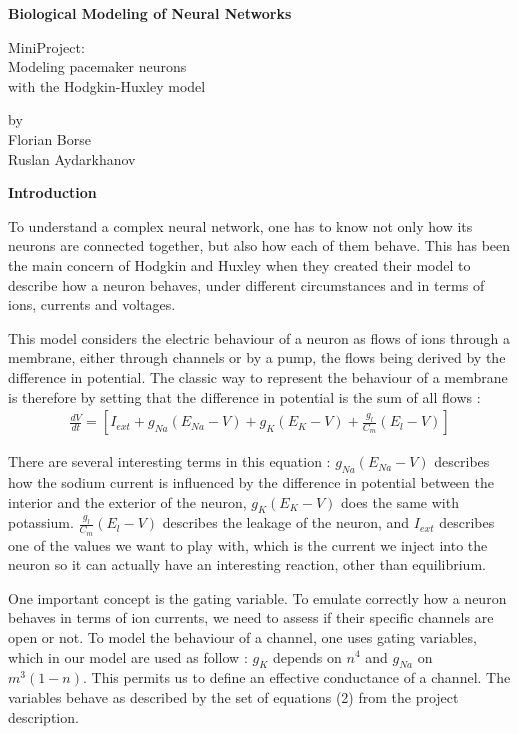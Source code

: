 \documentclass[a4paper,11pt]{article} %
\begin{document}
\begin{center}
    \bfseries\Large
    Biological Modeling of Neural Networks

    \vspace{8pt}

    MiniProject:\\
    Modeling pacemaker neurons\\
    with the Hodgkin-Huxley model


\end{center}
\begin{center}
    by\\
    Florian Borse\\
    Ruslan Aydarkhanov
\end{center}

{\large \bf Introduction}

\vspace{10pt}
To understand a complex neural network, one has to know not only how its
neurons are connected together, but also how each of them behave.
This has been the main concern of Hodgkin and Huxley when they created
their model to describe how a neuron behaves, under different circumstances
and in terms of ions, currents and voltages.

This model considers the electric behaviour of a neuron as flows of ions
through a membrane, either through channels or by a pump, the flows being
derived by the difference in potential. The classic way to represent the
behaviour of a membrane is therefore by setting that the difference in
potential is the sum of all flows :
\begin{align*}\frac{dV}{dt} = [I_{ext}+g_{Na}(E_{Na}-V)+g_K(E_K-V)+\frac{g_l}{C_m}(E_l-V)]\end{align*}

There are several interesting terms in this equation : $g_{Na}(E_{Na}-V)$
describes how the sodium current is influenced by the difference in
potential between the interior and the exterior of the neuron, $g_K(E_K-V)$
does the same with potassium. $\frac{g_l}{C_m}(E_l-V)$ describes the
leakage of the neuron, and $I_{ext}$ describes one of the values we want
to play with, which is the current we inject into the neuron so it can
actually have an interesting reaction, other than equilibrium.

One important concept is the gating variable. To emulate correctly how
a neuron behaves in terms of ion currents, we need to assess if their
specific channels are open or not. To model the behaviour of a channel,
one uses gating variables, which in our model are used as follow :
$g_K$ depends on $n^4$ and $g_{Na}$ on $m^3(1-n)$. This permits us to
define an effective conductance of a channel. The variables behave as
described by the set of equations (2) from the project description.
\end{document}
